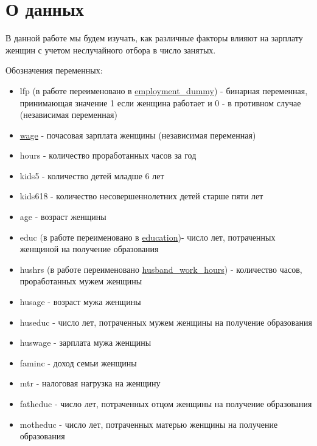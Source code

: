 \documentclass[a4paper,12pt]{article}
\begin{document}
	\newpage
	
	\tableofcontents
	
	
	\newpage
	
	\section{О данных}
	
	В данной работе  мы будем изучать, как различные факторы влияют на зарплату женщин с учетом неслучайного отбора в число занятых.

	Обозначения переменных:
	
	\begin{itemize}
		\item lfp (в работе переименовано в \underline{employment\_dummy}) - бинарная переменная, принимающая значение 1
		      если женщина работает и 0 - в противном случае (независимая переменная)
		\item \underline{wage} - почасовая зарплата женщины (независимая переменная)
		
		\vspace{0.7cm}
		
		\item hours - количество проработанных часов за год
		\item kids5 - количество детей младше 6 лет
		\item kids618 - количество несовершеннолетних детей
		          старше пяти лет
		\item age - возраст женщины
		
		\vspace{0.3cm}
		
		\item educ (в работе переименовано в \underline{education})- число лет, потраченных женщиной на
		        получение образования
		
		\vspace{0.3cm}
		
		\item hushrs (в работе переименовано \underline{husband\_work\_hours}) - количество часов, проработанных мужем женщины
		
		\vspace{0.3cm}
		
		\item husage - возраст мужа женщины
		\item huseduc - число лет, потраченных мужем женщины на
		           получение образования
		\item huswage - зарплата мужа женщины
		\item faminc - доход семьи женщины
		\item mtr - налоговая нагрузка на женщину
		\item fatheduc - число лет, потраченных отцом женщины на
		          получение образования
		\item motheduc - число лет, потраченных матерью женщины на
		            получение образования
		            

\end{itemize}
\end{document}
